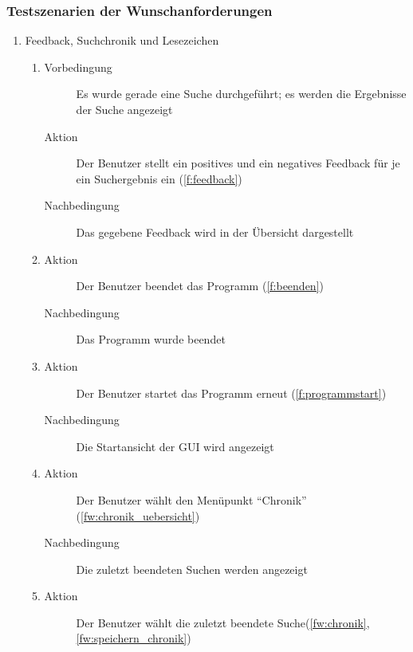 \subsubsection{Testszenarien der Wunschanforderungen}
\begin{enumerate} [label=\bfseries /TSW \arabic*0/, leftmargin=*]
	\item \gls{Feedback}, \gls{Suchchronik} und \gls{Lesezeichen} \label{ts:feedback_chronik_lesezeichen}
	\begin{enumerate}[leftmargin=0pt]
		\item
		\begin{description}
			\item[Vorbedingung] Es wurde gerade eine Suche durchgeführt; es werden die Ergebnisse der Suche angezeigt
			\item[Aktion] Der Benutzer stellt ein positives und ein negatives \gls{Feedback} für je ein Suchergebnis ein (\ref{f:feedback})
			\item[Nachbedingung] Das gegebene \gls{Feedback} wird in der Übersicht dargestellt
		\end{description}
		\item
		\begin{description}
			\item[Aktion] Der Benutzer beendet das Programm (\ref{f:beenden})
			\item[Nachbedingung] Das Programm wurde beendet
		\end{description}
		\item
		\begin{description}
			\item[Aktion] Der Benutzer startet das Programm erneut (\ref{f:programmstart})
			\item[Nachbedingung] Die Startansicht der \gls{GUI} wird angezeigt
		\end{description}
		\item
		\begin{description}
			\item[Aktion] Der Benutzer wählt den Menüpunkt \enquote{Chronik} (\ref{fw:chronik_uebersicht})
			\item[Nachbedingung] Die zuletzt beendeten Suchen werden angezeigt
		\end{description}
		\item
		\begin{description}
			\item[Aktion] Der Benutzer wählt die zuletzt beendete Suche(\ref{fw:chronik}, \ref{fw:speichern_chronik})

\end{description}
\end{enumerate}
\end{enumerate}
